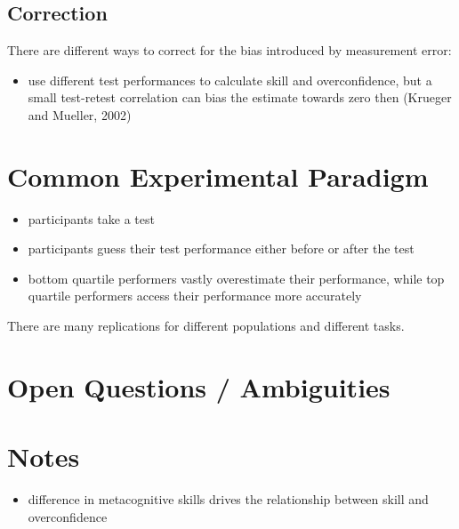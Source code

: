 \documentclass[a4paper,11pt]{article}
\newcommand{\1}{\mathbf{1}}
\begin{document}
\subsection{Correction}
There are different ways to correct for the bias introduced by measurement error:
\begin{itemize}
 \item use different test performances to calculate skill and overconfidence, but a small test-retest correlation can bias the estimate towards zero then (Krueger and Mueller, 2002)
\end{itemize}

\section{Common Experimental Paradigm}
\begin{itemize}
 \item participants take a test
 \item participants guess their test performance either before or after the test
 \item bottom quartile performers vastly overestimate their performance, while top quartile performers access their performance more accurately
\end{itemize}

There are many replications for different populations and different tasks.

\section{Open Questions / Ambiguities}

\section{Notes}
\begin{itemize}
 \item difference in metacognitive skills drives the relationship between skill and overconfidence
\end{itemize}
\end{document}
